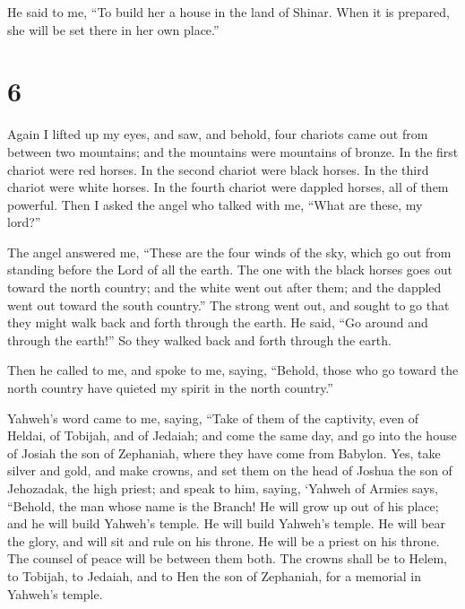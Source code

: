  He said to me, ``To build her a house in the land of
Shinar. When it is prepared, she will be set there in her own place.''

\hypertarget{section-5}{%
\section{6}\label{section-5}}

 Again I lifted up my eyes, and saw, and behold, four
chariots came out from between two mountains; and the mountains were
mountains of bronze.  In the first chariot were red
horses. In the second chariot were black horses.  In the
third chariot were white horses. In the fourth chariot were dappled
horses, all of them powerful.  Then I asked the angel who
talked with me, ``What are these, my lord?''

 The angel answered me, ``These are the four winds of the
sky, which go out from standing before the Lord of all the earth.
 The one with the black horses goes out toward the north
country; and the white went out after them; and the dappled went out
toward the south country.''  The strong went out, and
sought to go that they might walk back and forth through the earth. He
said, ``Go around and through the earth!'' So they walked back and forth
through the earth.

 Then he called to me, and spoke to me, saying, ``Behold,
those who go toward the north country have quieted my spirit in the
north country.''

 Yahweh's word came to me, saying,  ``Take
of them of the captivity, even of Heldai, of Tobijah, and of Jedaiah;
and come the same day, and go into the house of Josiah the son of
Zephaniah, where they have come from Babylon.  Yes, take
silver and gold, and make crowns, and set them on the head of Joshua the
son of Jehozadak, the high priest;  and speak to him,
saying, `Yahweh of Armies says, ``Behold, the man whose name is the
Branch! He will grow up out of his place; and he will build Yahweh's
temple.  He will build Yahweh's temple. He will bear the
glory, and will sit and rule on his throne. He will be a priest on his
throne. The counsel of peace will be between them both. 
The crowns shall be to Helem, to Tobijah, to Jedaiah, and to Hen the son
of Zephaniah, for a memorial in Yahweh's temple.

